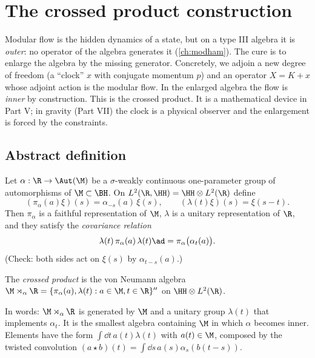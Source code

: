 \chapter{The crossed product construction}\label{ch:crossed}

\begin{physmotiv}
Modular flow is the hidden dynamics of a state, but on a type III algebra it is \emph{outer}: no operator of the algebra generates it (\cref{ch:modham}). The cure is to enlarge the algebra by the missing generator. Concretely, we adjoin a new degree of freedom (a ``clock'' $x$ with conjugate momentum $p$) and an operator $X=K+x$ whose adjoint action is the modular flow. In the enlarged algebra the flow is \emph{inner} by construction. This is the crossed product. It is a mathematical device in Part V; in gravity (Part VII) the clock is a physical observer and the enlargement is forced by the constraints.
\end{physmotiv}

\section{Abstract definition}

Let $\alpha:\R\to\Aut(\M)$ be a $\sigma$-weakly continuous one-parameter group of automorphisms of $\M\subset\BH$. On $L^2(\R,\HH)=\HH\otimes L^2(\R)$ define
\begin{equation}
(\pi_\alpha(a)\xi)(s)=\alpha_{-s}(a)\,\xi(s),\qquad(\lambda(t)\xi)(s)=\xi(s-t).
\end{equation}
Then $\pi_\alpha$ is a faithful representation of $\M$, $\lambda$ is a unitary representation of $\R$, and they satisfy the \emph{covariance relation}
\begin{equation}
\lambda(t)\,\pi_\alpha(a)\,\lambda(t)\ad=\pi_\alpha\big(\alpha_t(a)\big).
\end{equation}
(Check: both sides act on $\xi(s)$ by $\alpha_{t-s}(a)$.)

\begin{definition}
The \emph{crossed product} is the von Neumann algebra $\M\rtimes_\alpha\R=\{\pi_\alpha(a),\lambda(t):a\in\M,t\in\R\}''$ on $\HH\otimes L^2(\R)$.
\end{definition}

In words: $\M\rtimes_\alpha\R$ is generated by $\M$ and a unitary group $\lambda(t)$ that implements $\alpha_t$. It is the smallest algebra containing $\M$ in which $\alpha$ becomes inner. Elements have the form $\int\dd t\,a(t)\lambda(t)$ with $a(t)\in\M$, composed by the twisted convolution $(a\star b)(t)=\int\dd s\,a(s)\alpha_s(b(t-s))$.


